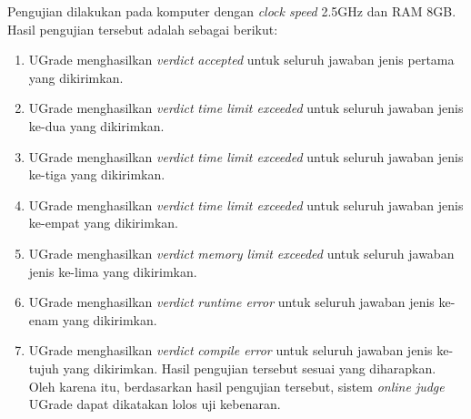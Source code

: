 \par Pengujian dilakukan pada komputer dengan \textit{clock speed} 2.5GHz dan RAM 8GB. Hasil pengujian tersebut adalah sebagai berikut:
\begin{enumerate}
	\item UGrade menghasilkan \textit{verdict} \textit{accepted} untuk seluruh jawaban jenis pertama yang dikirimkan.
	\item UGrade menghasilkan \textit{verdict} \textit{time limit exceeded} untuk seluruh jawaban jenis ke-dua yang dikirimkan.
	\item UGrade menghasilkan \textit{verdict} \textit{time limit exceeded} untuk seluruh jawaban jenis ke-tiga yang dikirimkan.
	\item UGrade menghasilkan \textit{verdict} \textit{time limit exceeded} untuk seluruh jawaban jenis ke-empat yang dikirimkan.
	\item UGrade menghasilkan \textit{verdict} \textit{memory limit exceeded} untuk seluruh jawaban jenis ke-lima yang dikirimkan.
	\item UGrade menghasilkan \textit{verdict} \textit{runtime error} untuk seluruh jawaban jenis ke-enam yang dikirimkan.
	\item UGrade menghasilkan \textit{verdict} \textit{compile error} untuk seluruh jawaban jenis ke-tujuh yang dikirimkan.
Hasil pengujian tersebut sesuai yang diharapkan. Oleh karena itu, berdasarkan hasil pengujian tersebut, sistem \textit{online judge} UGrade dapat dikatakan lolos uji kebenaran.

\end{enumerate}

